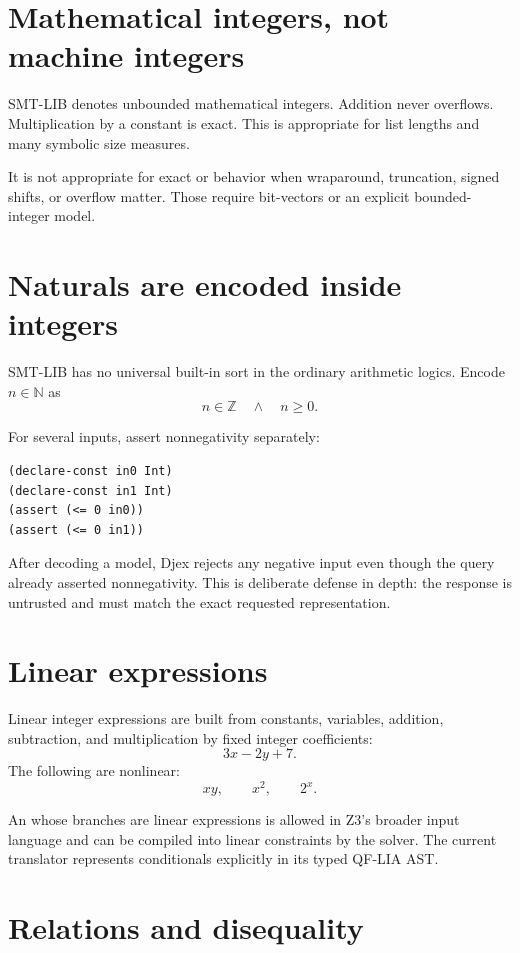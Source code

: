\documentclass[10pt,letterpaper,oneside]{report}
\newcommand{\code}[1]{\texttt{\detokenize{#1}}}
\newcommand{\Nat}{\mathbb{N}}
\newcommand{\Int}{\mathbb{Z}}
\begin{document}
\section{Mathematical integers, not machine integers}

SMT-LIB \code{Int} denotes unbounded mathematical integers. Addition never overflows. Multiplication by a constant is exact. This is appropriate for list lengths and many symbolic size measures.

It is not appropriate for exact \code{UInt32} or \code{Int64} behavior when wraparound, truncation, signed shifts, or overflow matter. Those require bit-vectors or an explicit bounded-integer model.

\section{Naturals are encoded inside integers}

SMT-LIB has no universal built-in \code{Nat} sort in the ordinary arithmetic logics. Encode $n\in\Nat$ as
\[
  n\in\Int\quad\land\quad n\ge 0.
\]

For several inputs, assert nonnegativity separately:

\begin{lstlisting}[language=SMTLib]
(declare-const in0 Int)
(declare-const in1 Int)
(assert (<= 0 in0))
(assert (<= 0 in1))
\end{lstlisting}

After decoding a model, Djex rejects any negative input even though the query already asserted nonnegativity. This is deliberate defense in depth: the response is untrusted and must match the exact requested representation.

\section{Linear expressions}

Linear integer expressions are built from constants, variables, addition, subtraction, and multiplication by fixed integer coefficients:
\[
  3x-2y+7.
\]
The following are nonlinear:
\[
  xy,\qquad x^2,\qquad 2^x.
\]

An \code{ite} whose branches are linear expressions is allowed in Z3's broader input language and can be compiled into linear constraints by the solver. The current translator represents conditionals explicitly in its typed QF-LIA AST.

\section{Relations and disequality}
\end{document}
